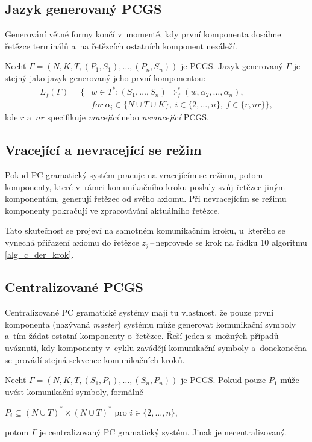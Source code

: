 \subsection*{Jazyk generovaný PCGS}\label{def_gener_jazyk_pcgs}
Generování větné formy končí v~momentě, kdy první komponenta dosáhne řetězce terminálů a~na řetězcích ostatních komponent nezáleží.
\begin{definition}
    Nechť $\Gamma = (N, K, T, (P_1, S_1), \ldots, (P_n, S_n))$ je PCGS.
    Jazyk generovaný $\Gamma$ je stejný jako jazyk generovaný jeho první komponentou:
    \begin{align*}
        L_f(\Gamma) = \{&w \in T^*: (S_1, \ldots, S_n) \Rightarrow^*_f (w, \alpha_2, \ldots, \alpha_n),\\ 
        &for\ \alpha_i \in \{N \cup T \cup K\},\ i \in \{2, \ldots, n\},\ f \in \{r, nr\}\},
    \end{align*}
    kde $r$ a~$nr$ specifikuje \emph{vracející} nebo \emph{nevracející} PCGS.
\end{definition}

\subsection*{Vracející a nevracející se režim}
Pokud PC gramatický systém pracuje na vracejícím se režimu, potom komponenty, které v~rámci komunikačního kroku poslaly svůj řetězec jiným komponentám, generují řetězec od svého axiomu.
Při nevracejícím se režimu komponenty pokračují ve zpracovávání aktuálního řetězce.

Tato skutečnost se projeví na samotném komunikačním kroku, u~kterého se vynechá přiřazení axiomu do řetězce $z_j$\,--\,neprovede se krok na řádku 10 algoritmu \ref{alg_c_der_krok}.

\subsection*{Centralizované PCGS}
Centralizované PC gramatické systémy mají tu vlastnost, že pouze první komponenta (nazývaná \emph{master}) systému může generovat komunikační symboly a~tím žádat ostatní komponenty o~řetězce.
Řeší jeden z~možných případů uváznutí, kdy komponenty v~cyklu zavádějí komunikační symboly a~donekonečna se provádí stejná sekvence komunikačních kroků. 

\begin{definition}
    Nechť $\Gamma = (N, K, T, (S_1, P_1), \ldots, (S_n, P_n))$ je PCGS.
    Pokud pouze $P_1$ může uvést komunikační symboly, formálně
    \begin{center}
        $P_i \subseteq (N \cup T)^* \times (N \cup T)^*$ pro $i \in \{2, \ldots, n\}$,
    \end{center}
    potom $\Gamma$ je centralizovaný PC gramatický systém.
    Jinak je necentralizovaný.
\end{definition}

